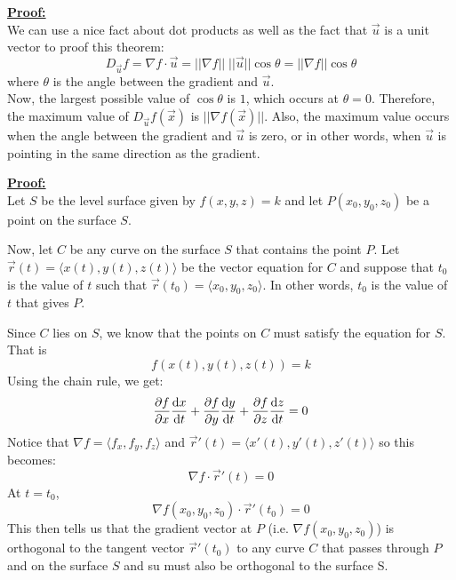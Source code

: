 \underline{\textbf{Proof:}} \\
We can use a nice fact about dot products as well as the fact that $\vec{u}$ is a unit vector to proof this theorem:
\[ D_{\vec{u}}f = \nabla f \cdot \vec{u} = ||\nabla f|| \; ||\vec{u}|| \cos\theta = ||\nabla f|| \cos\theta \]
where $\theta$ is the angle between the gradient and $\vec{u}$. \\
Now, the largest possible value of $\cos\theta$ is $1$, which occurs at $\theta=0$. Therefore, the maximum value of $D_{\vec{u}} f(\vec{x})$ is $||\nabla f(\vec{x})||$. Also, the maximum value occurs when the angle between the gradient and $\vec{u}$ is zero, or in other words, when $\vec{u}$ is pointing in the same direction as the gradient.


\underline{\textbf{Proof:}} \\
Let $S$ be the level surface given by $f(x,y,z)=k$ and let $P(x_0,y_0,z_0)$ be a point on the surface $S$.

Now, let $C$ be any curve on the surface $S$ that contains the point $P$. Let $\vec{r}(t) = \langle x(t), y(t), z(t) \rangle$ be the vector equation for $C$ and suppose that $t_0$ is the value of $t$ such that $\vec{r}(t_0) = \langle x_0,y_0,z_0 \rangle$. In other words, $t_0$ is the value of $t$ that gives $P$.

Since $C$ lies on $S$, we know that the points on $C$ must satisfy the equation for $S$. That is \[ 
    f(x(t),y(t),z(t)) = k
\]
Using the chain rule, we get: \[ 
    \pdv{f}{x} \dv{x}{t} + \pdv{f}{y} \dv{y}{t} + \pdv{f}{z} \dv{z}{t} = 0
\]
Notice that $\nabla f = \langle f_x,f_y,f_z \rangle$ and $\vec{r}'(t) = \langle x'(t),y'(t),z'(t) \rangle$ so this becomes: \[ 
    \nabla f \cdot \vec{r}'(t) = 0
\]
At $t = t_0$, \[ 
    \nabla f(x_0,y_0,z_0) \cdot \vec{r}'(t_0) = 0
\]
This then tells us that the gradient vector at $P$ (i.e. $\nabla f(x_0,y_0,z_0)$) is orthogonal to the tangent vector $\vec{r}'(t_0)$ to any curve $C$ that passes through $P$ and on the surface $S$ and su must also be orthogonal to the surface S.
